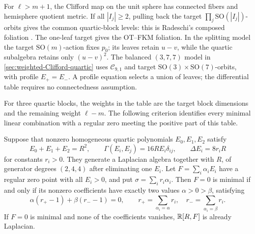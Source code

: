 \begin{remark}
\label{rem:weighted-Clifford-foliation}
For $\ell>m+1$, the Clifford map on the unit sphere has connected
fibers and hemisphere quotient metric. If all $|I_j|\geq2$, pulling
back the target $\prod_j\mathrm{SO}(|I_j|)$-orbits gives the common
quartic-block levels: this is Radeschi's composed foliation
\cite[Theorems~A--B and Section~3]{Radeschi14}. The one-leaf target
gives the OT--FKM foliation. In the splitting model the target
$\mathrm{SO}(m)$-action fixes $p_0$; its leaves retain $u-v$, while
the quartic subalgebra retains only $(u-v)^2$.
The balanced $(3,7,7)$ model in
\cref{sec:weighted-Clifford-quartic} uses $\mathcal C_{9,1}$ and
target $\mathrm{SO}(3)\times\mathrm{SO}(7)$-orbits, with profile
$E_+=E_-$. A profile equation selects a union of leaves; the
differential table requires no connectedness assumption.
\end{remark}

For three quartic blocks, the weights in the table are the target
block dimensions and the remaining weight $\ell-m$. The following
criterion identifies every minimal linear combination with a regular
zero meeting the positive part of this table.

\begin{proposition}
\label{prop:orthogonal-quartics}
Suppose that nonzero homogeneous quartic polynomials $E_0,E_1,E_2$ satisfy
\begin{equation}\label{eq:orthogonal-quartic-data}
 E_0+E_1+E_2=R^2,\qquad
 \Gamma(E_i,E_j)=16RE_i\delta_{ij},\qquad
 \Delta E_i=8r_iR
\end{equation}
for constants $r_i>0$. They generate a Laplacian algebra together
with $R$, of generator degrees $(2,4,4)$ after eliminating one $E_i$.
Let $F=\sum_i\alpha_iE_i$ have a regular zero point with all $E_i>0$,
and put $\sigma=\sum_i r_i\alpha_i$.
Then $F=0$ is minimal if and only if its nonzero coefficients have
exactly two values $\alpha>0>\beta$, satisfying
\begin{equation}\label{eq:quartic-level-condition}
 \alpha(r_+-1)+\beta(r_--1)=0,\qquad
 r_+=\sum_{\alpha_i=\alpha}r_i,\quad r_-=\sum_{\alpha_i=\beta}r_i.
\end{equation}
If $F=0$ is minimal and none of the coefficients vanishes,
$\mathbb R[R,F]$ is already Laplacian.
\end{proposition}

